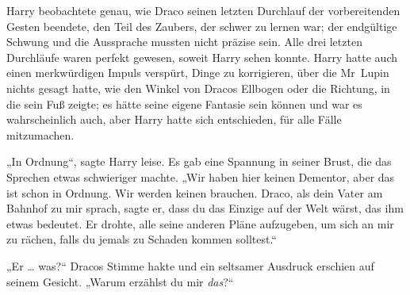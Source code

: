 \later

Harry beobachtete genau, wie Draco seinen letzten Durchlauf der vorbereitenden Gesten beendete, den Teil des Zaubers, der schwer zu lernen war; der endgültige Schwung und die Aussprache mussten nicht präzise sein. Alle drei letzten Durchläufe waren perfekt gewesen, soweit Harry sehen konnte. Harry hatte auch einen merkwürdigen Impuls verspürt, Dinge zu korrigieren, über die Mr~Lupin nichts gesagt hatte, wie den Winkel von Dracos Ellbogen oder die Richtung, in die sein Fuß zeigte; es hätte seine eigene Fantasie sein können und war es wahrscheinlich auch, aber Harry hatte sich entschieden, für alle Fälle mitzumachen.

„In Ordnung“, sagte Harry leise. Es gab eine Spannung in seiner Brust, die das Sprechen etwas schwieriger machte.
„Wir haben hier keinen Dementor, aber das ist schon in Ordnung. Wir werden keinen brauchen. Draco, als dein Vater am Bahnhof zu mir sprach, sagte er, dass du das Einzige auf der Welt wärst, das ihm etwas bedeutet. Er drohte, alle seine anderen Pläne aufzugeben, um sich an mir zu rächen, falls du jemals zu Schaden kommen solltest.“

„Er … was?“ Dracos Stimme hakte und ein seltsamer Ausdruck erschien auf seinem Gesicht.
„Warum erzählst du mir \emph{das}?“

